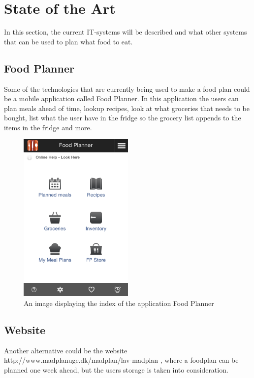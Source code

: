 \section{State of the Art}
In this section, the current IT-systems will be described and what other systems that can be used to plan what food to eat.

\subsection{Food Planner}
Some of the technologies that are currently being used to make a food plan could be a mobile application called Food Planner.
In this application the users can plan meals ahead of time, lookup recipes, look at what groceries that needs to be bought,
list what the user have in the fridge so the grocery list appends to the items in the fridge and more.

\begin{figure}[H]
    \centering
    \includegraphics[width=0.5\textwidth]{Grafik/FoodPlanner/index}
    \caption{An image displaying the index of the application Food Planner}
    \label{FoodPlannerIndex}
\end{figure}


\subsection{Website}
Another alternative could be the website http://www.madplanuge.dk/madplan/lav-madplan 
, where a foodplan can be planned one week ahead, but the users storage is taken into consideration.

